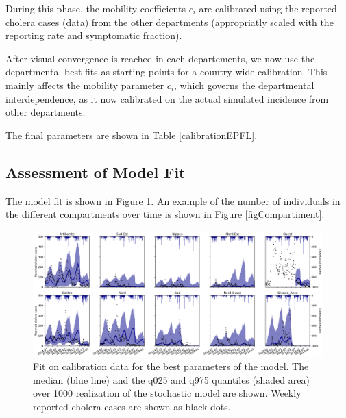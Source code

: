 During this phase, the mobility coefficients $c_i$ are calibrated using the reported cholera cases (data) from the other departments (appropriatly scaled with the reporting rate and symptomatic fraction).

After visual convergence is reached in each departements, we now use the departmental best fits as starting points for a country-wide calibration. This mainly affects the mobility parameter $c_i$, which governs the departmental interdependence, as it now calibrated on the actual simulated incidence from other departments.

The final parameters are shown in Table \ref{calibrationEPFL}.

\subsection{Assessment of Model Fit}
The model fit is shown in Figure \ref{fitEPFL}. An example of the number of individuals in the different compartments over time is shown in Figure \ref{figCompartiment}.

\begin{figure}[htbp]
\begin{center}
\includegraphics[width=1.0\textwidth]{fig_cholera-haiti-ocv/fit.png}
\caption[Fit on calibration data for the best parameter of the model]{Fit on calibration data for the best parameters of the model. The median (blue line) and the q025 and q975 quantiles (shaded area) over 1000 realization of the stochastic model are shown. Weekly reported cholera cases are shown as black dots.}
\label{fitEPFL}
\end{center}
\end{figure}

